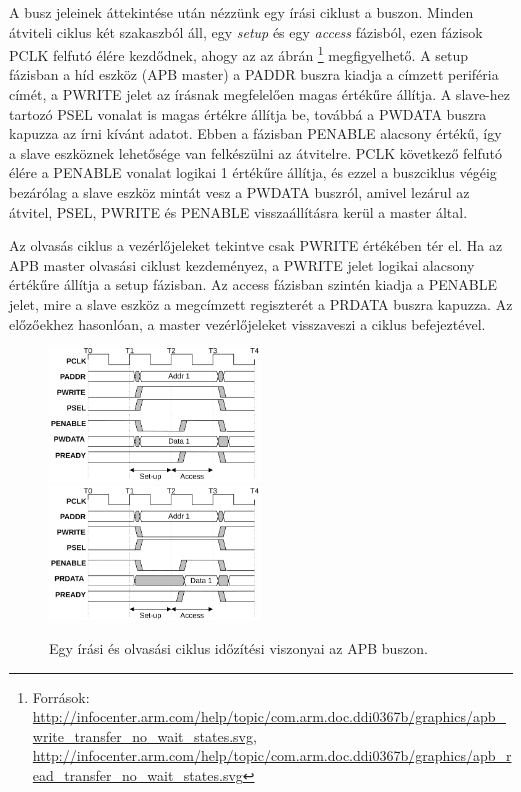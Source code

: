 {    A busz jeleinek áttekintése után nézzünk egy írási ciklust a buszon. Minden átviteli ciklus két szakaszból áll, egy \emph{setup} és egy \emph{access} fázisból, ezen fázisok PCLK felfutó élére kezdődnek, ahogy az az  ábrán
    \footnote{Források: \tiny\\\url{http://infocenter.arm.com/help/topic/com.arm.doc.ddi0367b/graphics/apb_write_transfer_no_wait_states.svg}, \\ \url{http://infocenter.arm.com/help/topic/com.arm.doc.ddi0367b/graphics/apb_read_transfer_no_wait_states.svg}} megfigyelhető. A setup fázisban a híd eszköz (APB master) a PADDR buszra kiadja a címzett periféria címét, a PWRITE jelet az írásnak megfelelően magas értékűre állítja. A slave-hez tartozó PSEL vonalat is magas értékre állítja be, továbbá a PWDATA buszra kapuzza az írni kívánt adatot. Ebben a fázisban PENABLE alacsony értékű, így a slave eszköznek lehetősége van felkészülni az átvitelre. PCLK következő felfutó élére a PENABLE vonalat logikai 1 értékűre állítja, és ezzel a buszciklus végéig bezárólag a slave eszköz mintát vesz a PWDATA buszról, amivel lezárul az átvitel, PSEL, PWRITE és PENABLE visszaállításra kerül a master által.

    Az olvasás ciklus a vezérlőjeleket tekintve csak PWRITE értékében tér el. Ha az APB master olvasási ciklust kezdeményez, a PWRITE jelet logikai alacsony értékűre állítja a setup fázisban. Az access fázisban szintén kiadja a PENABLE jelet, mire a slave eszköz a megcímzett regiszterét a PRDATA buszra kapuzza. Az előzőekhez hasonlóan, a master vezérlőjeleket visszaveszi a ciklus befejeztével.
    \begin{figure}[ht!]
        \includegraphics[width = 0.5\textwidth]{figures/apb_write_transfer_no_wait_states}
        \includegraphics[width = 0.5\textwidth]{figures/apb_read_transfer_no_wait_states}
        \caption{Egy írási és olvasási ciklus időzítési viszonyai az APB buszon.}
        \label{fig:APBtransfers}
    \end{figure}
}


